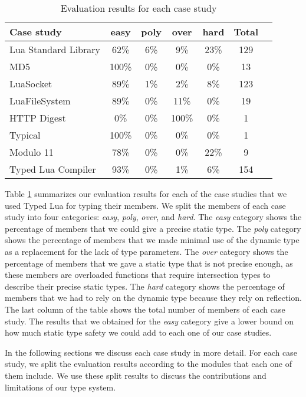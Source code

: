 \begin{table}[!ht]
\begin{center}
\begin{tabular}{|l|c|c|c|c|c|c|}
\hline
\textbf{Case study} & \textbf{easy} & \textbf{poly} & \textbf{over} & \textbf{hard} & \textbf{Total} \\
\hline
Lua Standard Library & 62\% & 6\% & 9\% & 23\% & 129 \\ %
\hline
MD5 & 100\% & 0\% & 0\% & 0\% & 13 \\ %
\hline
LuaSocket & 89\% & 1\% & 2\% & 8\% & 123 \\ %
\hline
LuaFileSystem & 89\% & 0\% & 11\% & 0\% & 19 \\ %
\hline
HTTP Digest & 0\% & 0\% & 100\% & 0\% & 1 \\ %
\hline
Typical & 100\% & 0\% & 0\% & 0\% & 1 \\ %
\hline
Modulo 11 & 78\% & 0\% & 0\% & 22\% & 9 \\ %
\hline
Typed Lua Compiler & 93\% & 0\% & 1\% & 6\% & 154 \\ %
\hline
\end{tabular}
\end{center}
\caption{Evaluation results for each case study}
\label{tab:evalbycase}
\end{table}

Table \ref{tab:evalbycase} summarizes our evaluation results for each
of the case studies that we used Typed Lua for typing their members.
We split the members of each case study into four categories:
\emph{easy}, \emph{poly}, \emph{over}, and \emph{hard}.
The \emph{easy} category shows the percentage of members that
we could give a precise static type.
The \emph{poly} category shows the percentage of members that
we made minimal use of the dynamic type as a replacement for the
lack of type parameters.
The \emph{over} category shows the percentage of members that
we gave a static type that is not precise enough,
as these members are overloaded functions that require intersection
types to describe their precise static types.
The \emph{hard} category shows the percentage of members that
we had to rely on the dynamic type because they rely on reflection.
The last column of the table shows the total number of members
of each case study.
The results that we obtained for the \emph{easy} category give
a lower bound on how much static type safety
we could add to each one of our case studies.

In the following sections we discuss each case study in more detail.
For each case study, we split the evaluation results according
to the modules that each one of them include.
We use these split results to discuss the contributions and
limitations of our type system.

